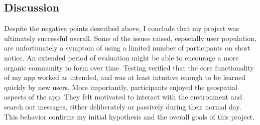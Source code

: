 \subsection{Discussion}

Despite the negative points described above, I conclude that my project was ultimately successful overall. Some of the issues raised, especially user population, are unfortunately a symptom of using a limited number of participants on short notice. An extended period of evaluation might be able to encourage a more organic community to form over time. Testing verified that the core functionality of my app worked as intended, and was at least intuitive enough to be learned quickly by new users. More importantly, participants enjoyed the geospatial aspects of the app. They felt motivated to interact with the environment and search out messages, either deliberately or passively during their normal day. This behavior confirms my initial hypothesis and the overall goals of this project.
